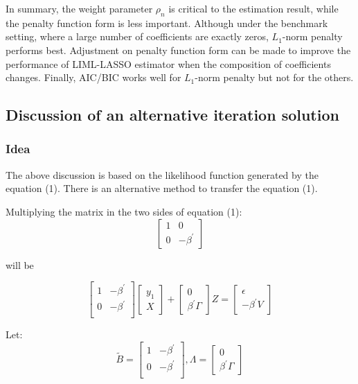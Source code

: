 \documentclass[12pt,pdftex,letterpaper]{article}
\begin{document}
\indent In summary, the weight parameter $\rho_{n}$ is critical to the estimation result, while the penalty function form is less important. Although under the benchmark setting, where a large number of coefficients are exactly zeros, $L_{1}$-norm penalty performs best. Adjustment on penalty function form can be made to improve the performance of LIML-LASSO estimator when the composition of coefficients changes. Finally, AIC/BIC works well for $L_{1}$-norm penalty but not for the others. 

\subsection{Discussion of an alternative iteration solution}
\subsubsection{Idea}
The above discussion is based on the likelihood function generated by the equation (1). There is an alternative method to transfer the equation (1).

   Multiplying the matrix in the two sides of equation (1):
\begin{equation*}
\begin{bmatrix}
1 & 0 \\
0 & -\beta^{'}
\end{bmatrix}
\end{equation*}

will be

\begin{equation*}
\begin{bmatrix}
 1 & -\beta^{'} \\
 0  & -\beta^{'}  \\
\end{bmatrix}
\begin{bmatrix}
y_{1} \\
X
\end{bmatrix}
+
\begin{bmatrix}
0 \\
\beta^{'}\Gamma
\end{bmatrix}
Z
=
\begin{bmatrix}
\epsilon \\
-\beta^{'}V
\end{bmatrix}
\end{equation*}

Let:
\begin{equation*}
\tilde{B}=
\begin{bmatrix}
 1 & -\beta^{'} \\
 0  & -\beta^{'}  \\
\end{bmatrix}
,
\Lambda
=
\begin{bmatrix}
0 \\
\beta^{'}\Gamma
\end{bmatrix}
\end{equation*}
\end{document}
